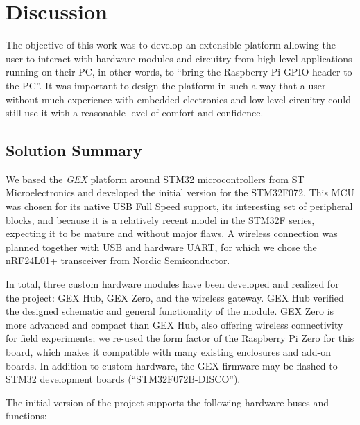 \chapter{Discussion}

The objective of this work was to develop an extensible platform allowing the user to interact with hardware modules and circuitry from high-level applications running on their \gls{PC}, in other words, to ``bring the Raspberry Pi \gls{GPIO} header to the \gls{PC}''. It was important to design the platform in such a way that a user without much experience with embedded electronics and low level circuitry could still use it with a reasonable level of comfort and confidence.

\section{Solution Summary}

We based the \textit{GEX} platform around STM32 microcontrollers from ST Microelectronics and developed the initial version for the STM32F072. This \gls{MCU} was chosen for its native \gls{USB} Full Speed support, its interesting set of peripheral blocks, and because it is a relatively recent model in the STM32F series, expecting it to be mature and without major flaws. A wireless connection was planned together with \gls{USB} and hardware \gls{UART}, for which we chose the nRF24L01+ transceiver from Nordic Semiconductor.

In total, three custom hardware modules have been developed and realized for the project: GEX Hub, GEX Zero, and the wireless gateway. GEX Hub verified the designed schematic and general functionality of the module. GEX Zero is more advanced and compact than GEX Hub, also offering wireless connectivity for field experiments; we re-used the form factor of the Raspberry Pi Zero for this board, which makes it compatible with many existing enclosures and add-on boards. In addition to custom hardware, the GEX firmware may be flashed to STM32 development boards (``STM32F072B-DISCO'').

\noindent
The initial version of the project supports the following hardware buses and functions:

